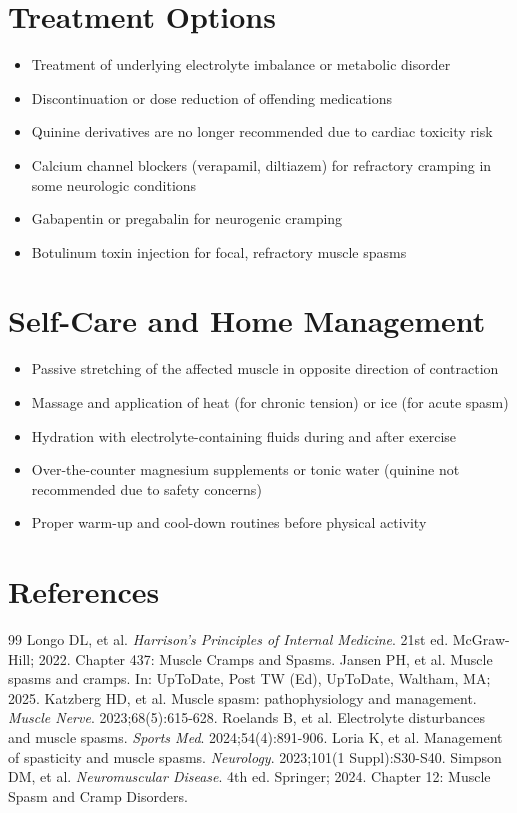 \section*{Treatment Options}
\begin{itemize}
  \item Treatment of underlying electrolyte imbalance or metabolic disorder
  \item Discontinuation or dose reduction of offending medications
  \item Quinine derivatives are no longer recommended due to cardiac toxicity risk
  \item Calcium channel blockers (verapamil, diltiazem) for refractory cramping in some neurologic conditions
  \item Gabapentin or pregabalin for neurogenic cramping
  \item Botulinum toxin injection for focal, refractory muscle spasms
\end{itemize}

\section*{Self-Care and Home Management}
\begin{itemize}
  \item Passive stretching of the affected muscle in opposite direction of contraction
  \item Massage and application of heat (for chronic tension) or ice (for acute spasm)
  \item Hydration with electrolyte-containing fluids during and after exercise
  \item Over-the-counter magnesium supplements or tonic water (quinine not recommended due to safety concerns)
  \item Proper warm-up and cool-down routines before physical activity
\end{itemize}

\section*{References}

\begin{thebibliography}{99}
 Longo DL, et al. \emph{Harrison's Principles of Internal Medicine}. 21st ed. McGraw-Hill; 2022. Chapter 437: Muscle Cramps and Spasms.
 Jansen PH, et al. Muscle spasms and cramps. In: UpToDate, Post TW (Ed), UpToDate, Waltham, MA; 2025.
 Katzberg HD, et al. Muscle spasm: pathophysiology and management. \emph{Muscle Nerve}. 2023;68(5):615-628.
 Roelands B, et al. Electrolyte disturbances and muscle spasms. \emph{Sports Med}. 2024;54(4):891-906.
 Loria K, et al. Management of spasticity and muscle spasms. \emph{Neurology}. 2023;101(1 Suppl):S30-S40.
 Simpson DM, et al. \emph{Neuromuscular Disease}. 4th ed. Springer; 2024. Chapter 12: Muscle Spasm and Cramp Disorders.
\end{thebibliography}
